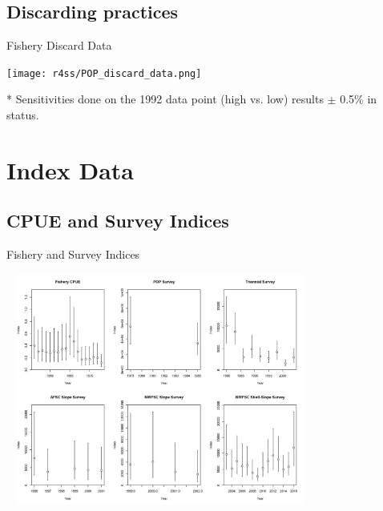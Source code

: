 \documentclass[pdf]{beamer}\usepackage[]{graphicx}\usepackage[]{color}
\begin{document}
\subsection{Discarding practices}
\begin{frame}{Fishery Discard Data}
  \begin{center}
    \texttt{[image: r4ss/POP\_discard\_data.png]}
  \end{center}
  * \small{Sensitivities done on the 1992 data point (high vs. low) results $\pm$ 0.5\%  in status.}
\end{frame}

\section{Index Data}

\subsection{CPUE and Survey Indices}
\begin{frame}{Fishery and Survey Indices}
  \begin{center}
  \includegraphics[height = 3in, width = 4in]{figures/Index_Data.png}
  \end{center}
\end{frame}
\end{document}
